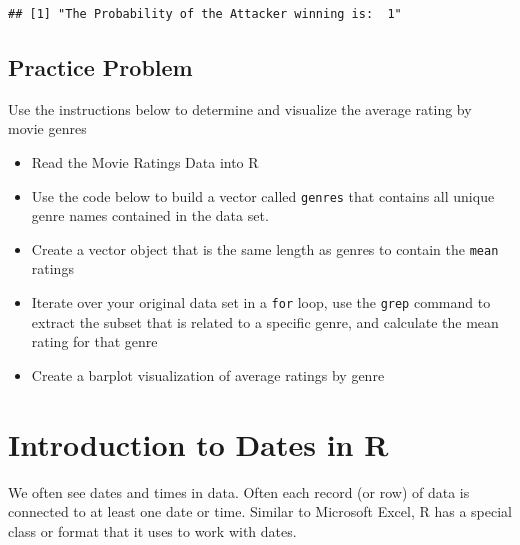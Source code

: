 \documentclass[]{book}
\newenvironment{Shaded}{\begin{snugshade}}{\end{snugshade}}
\newcommand{\KeywordTok}[1]{\textcolor[rgb]{0.13,0.29,0.53}{\textbf{{#1}}}}
\newcommand{\CharTok}[1]{\textcolor[rgb]{0.31,0.60,0.02}{{#1}}}
\newcommand{\StringTok}[1]{\textcolor[rgb]{0.31,0.60,0.02}{{#1}}}
\newcommand{\NormalTok}[1]{{#1}}
\providecommand{\tightlist}{%
  \setlength{\itemsep}{0pt}\setlength{\parskip}{0pt}}
\begin{document}
\begin{verbatim}
## [1] "The Probability of the Attacker winning is:  1"
\end{verbatim}

\section{Practice Problem}\label{practice-problem-3}

Use the instructions below to determine and visualize the average rating
by movie genres

\begin{itemize}
\tightlist
\item
  Read the Movie Ratings Data into R
\item
  Use the code below to build a vector called \texttt{genres} that
  contains all unique genre names contained in the data set.
\end{itemize}

\begin{Shaded}
\end{Shaded}

\begin{itemize}
\tightlist
\item
  Create a vector object that is the same length as genres to contain
  the \texttt{mean} ratings
\item
  Iterate over your original data set in a \texttt{for} loop, use the
  \texttt{grep} command to extract the subset that is related to a
  specific genre, and calculate the mean rating for that genre
\item
  Create a barplot visualization of average ratings by genre
\end{itemize}

\chapter{Introduction to Dates in R}\label{introduction-to-dates-in-r}

We often see dates and times in data. Often each record (or row) of data
is connected to at least one date or time. Similar to Microsoft Excel, R
has a special class or format that it uses to work with dates.
\end{document}
